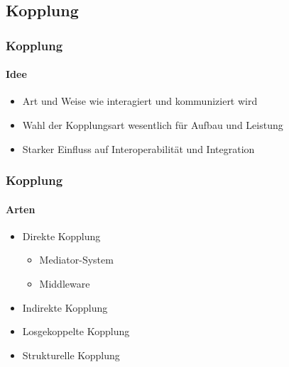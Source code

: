 \subsection{Kopplung}
\begin{frame}
  \frametitle{Kopplung}
  \framesubtitle{Idee}
  \begin{itemize}
    \item Art und Weise wie interagiert und kommuniziert wird
    \item Wahl der Kopplungsart wesentlich für Aufbau und Leistung
    \item Starker Einfluss auf Interoperabilität und Integration
  \end{itemize}
\end{frame}

\begin{frame}
  \frametitle{Kopplung}
  \framesubtitle{Arten}
  \begin{itemize}
    \item Direkte Kopplung
    \begin{itemize}
      \item Mediator-System
      \item Middleware
    \end{itemize}
    \item Indirekte Kopplung
    \item Losgekoppelte Kopplung
    \item Strukturelle Kopplung
  \end{itemize}
\end{frame}
